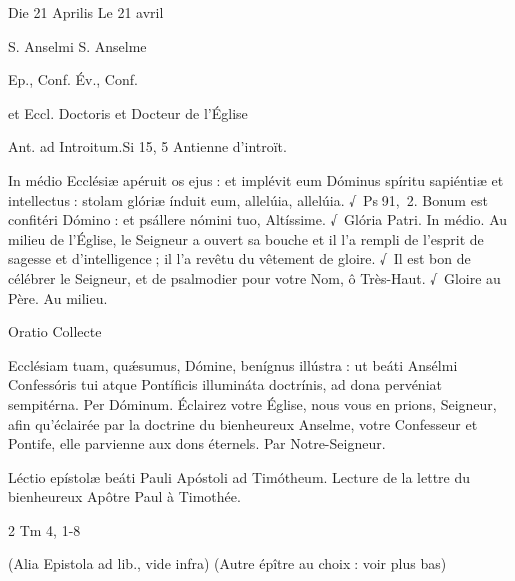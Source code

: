 \begin{paracol}{2}
Die 21 Aprilis
\switchcolumn
Le 21 avril
\switchcolumn*

S. Anselmi
\switchcolumn
S. Anselme
\switchcolumn*

Ep., Conf.
\switchcolumn
Év., Conf.
\switchcolumn*

et Eccl. Doctoris
\switchcolumn
et Docteur de l’Église
\switchcolumn*

Ant. ad Introitum.\hfill Si 15, 5
\switchcolumn
Antienne d’introït.
\switchcolumn*

In médio Ecclésiæ apéruit os ejus :  et implévit eum Dóminus spíritu sapiéntiæ et intellectus : stolam glóriæ índuit eum, allelúia, allelúia. √~Ps 91, 2. Bonum est confitéri Dómino : et psállere nómini tuo, Altíssime. √~Glória Patri. In médio.
\switchcolumn
Au milieu de l’Église, le Seigneur a ouvert sa bouche et il l’a rempli de l’esprit de sagesse et d’intelligence ; il l’a revêtu du vêtement de gloire. √~Il est bon de célébrer le Seigneur, et de psalmodier pour votre Nom, ô Très-Haut. √~Gloire au Père. Au milieu.
\switchcolumn*

Oratio
\switchcolumn
Collecte
\switchcolumn*

Ecclésiam tuam, quǽsumus,  Dómine, benígnus illústra : ut beáti Ansélmi Confessóris tui atque Pontíficis illumináta doctrínis, ad dona pervéniat sempitérna. Per Dóminum.
\switchcolumn
Éclairez votre Église, nous vous en  prions, Seigneur, afin qu’éclairée par la doctrine du bienheureux Anselme, votre Confesseur et Pontife, elle parvienne aux dons éternels. Par Notre-Seigneur.
\switchcolumn*

Léctio epístolæ beáti Pauli Apóstoli ad Timótheum.
\switchcolumn
Lecture de la lettre du bienheureux Apôtre Paul à Timothée.
\switchcolumn*

2 Tm 4, 1-8
\switchcolumn

\switchcolumn*

(Alia Epistola ad lib., vide infra)
\switchcolumn
(Autre épître au choix : voir plus bas)
\switchcolumn*


\end{paracol}
